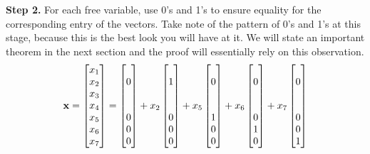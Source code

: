 \documentclass{ximera}
\begin{document}
\begin{example}
  \textbf{Step 2.}  For each free variable, use 0's and 1's to ensure
  equality for the corresponding entry of the vectors.  Take note of
  the pattern of 0's and 1's at this stage, because this is the best
  look you will have at it.  We will state an important theorem in the
  next section and the proof will essentially rely on this
  observation.
  \[
    \mathbf{x}=\begin{bmatrix}x_1\\x_2\\x_3\\x_4\\x_5\\x_6\\x_7\end{bmatrix}=
    \begin{bmatrix}\ \\0\\\ \\\ \\0\\0\\0\end{bmatrix}+
    x_2\begin{bmatrix}\ \\1\\\ \\\ \\0\\0\\0\end{bmatrix}+
    x_5\begin{bmatrix}\ \\0\\\ \\\ \\1\\0\\0\end{bmatrix}+
    x_6\begin{bmatrix}\ \\0\\\ \\\ \\0\\1\\0\end{bmatrix}+
    x_7\begin{bmatrix}\ \\0\\\ \\\ \\0\\0\\1\end{bmatrix}
  \]


\end{example}
\end{document}
